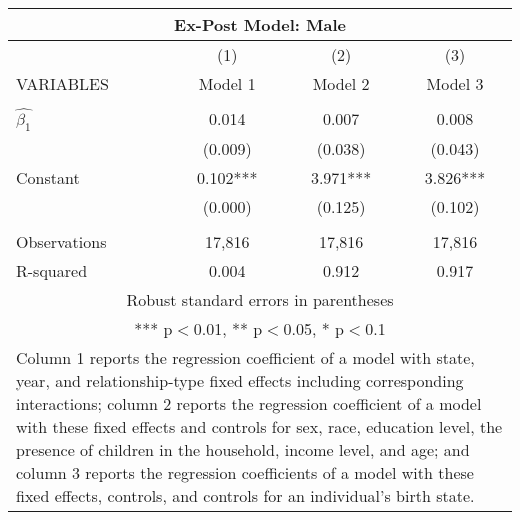 \begin{tabular}{lccc}
\multicolumn{4}{c}{Ex-Post Model: Male} \\ \hline
 & (1) & (2) & (3) \\
VARIABLES & Model 1 & Model 2 & Model 3 \\ \hline
 &  &  &  \\
$\hat{\beta_1}$ & 0.014 & 0.007 & 0.008 \\
 & (0.009) & (0.038) & (0.043) \\
Constant & 0.102*** & 3.971*** & 3.826*** \\
 & (0.000) & (0.125) & (0.102) \\
 &  &  &  \\
Observations & 17,816 & 17,816 & 17,816 \\
 R-squared & 0.004 & 0.912 & 0.917 \\ \hline
\multicolumn{4}{c}{ Robust standard errors in parentheses} \\
\multicolumn{4}{c}{ *** p$<$0.01, ** p$<$0.05, * p$<$0.1} \\
\multicolumn{4}{p{0.8\linewidth}}{\small Column 1 reports the regression coefficient of a model with state, year, and relationship-type fixed effects including corresponding interactions; column 2 reports the regression coefficient of a model with these fixed effects and controls for sex, race, education level, the presence of children in the household, income level, and age; and column 3 reports the regression coefficients of a model with these fixed effects, controls, and controls for an individual’s birth state.} \\
\end{tabular}
